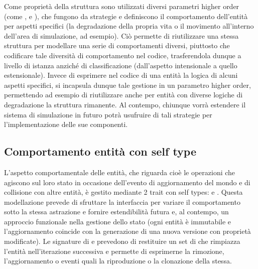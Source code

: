 Come proprietà della struttura sono utilizzati diversi parametri higher order (come ,  e ), che fungono da strategie e definiscono il comportamento dell’entità per aspetti specifici (la degradazione della propria vita o il movimento all’interno dell’area di simulazione, ad esempio). Ciò permette di riutilizzare una stessa struttura per modellare una serie di comportamenti diversi, piuttosto che codificare tale diversità di comportamento nel codice, trasferendola dunque a livello di istanza anziché di classificazione (dall’aspetto intensionale a quello estensionale). Invece di esprimere nel codice di una entità la logica di alcuni aspetti specifici, si incapsula dunque tale gestione in un parametro higher order, permettendo ad esempio di riutilizzare anche per entità con diverse logiche di degradazione la struttura rimanente. Al contempo, chiunque vorrà estendere il sistema di simulazione in futuro potrà usufruire di tali strategie per l’implementazione delle sue componenti.

\subsection{Comportamento entità con self type}
\label{section:self}
L’aspetto comportamentale delle entità, che riguarda cioè le operazioni che agiscono sul loro stato in occasione dell’evento di aggiornamento del mondo e di collisione con altre entità, è gestito mediante 2 trait con self types:  e . Questa modellazione prevede di sfruttare la interfaccia per variare il comportamento sotto la stessa astrazione e fornire estendibilità futura e, al contempo, un approccio funzionale nella gestione dello stato (ogni entità è immutabile e l’aggiornamento coincide con la generazione di una nuova versione con proprietà modificate). Le signature di  e  prevedono di restituire un set di  che rimpiazza l’entità nell’iterazione successiva e permette di esprimerne la rimozione, l’aggiornamento o eventi quali la riproduzione o la clonazione della stessa.

